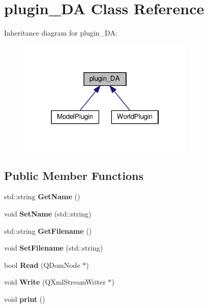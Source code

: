 \section{plugin\+\_\+\+DA Class Reference}
\label{classplugin___d_a}


Inheritance diagram for plugin\+\_\+\+DA\+:\nopagebreak
\begin{figure}[H]
\begin{center}
\leavevmode
\includegraphics[width=238pt]{classplugin___d_a__inherit__graph}
\end{center}
\end{figure}
\subsection*{Public Member Functions}
\begin{DoxyCompactItemize}
\item 
std\+::string {\bfseries Get\+Name} ()\label{classplugin___d_a_a1a3dfa9bbe0ad5acde3db7fcf5126581}

\item 
void {\bfseries Set\+Name} (std\+::string)\label{classplugin___d_a_ac25a25349a517ec702728a72941e7a6b}

\item 
std\+::string {\bfseries Get\+Filename} ()\label{classplugin___d_a_a83c8658a444d89c6359e47083a77e00c}

\item 
void {\bfseries Set\+Filename} (std\+::string)\label{classplugin___d_a_abdb5866ab1756ea2614d9af9744ef713}

\item 
bool {\bfseries Read} (Q\+Dom\+Node $\ast$)\label{classplugin___d_a_ab3a4c9cf8f84afad2de168514a398249}

\item 
void {\bfseries Write} (Q\+Xml\+Stream\+Writer $\ast$)\label{classplugin___d_a_a9449239cbdfcead545eed6812100cf60}

\item 
void {\bfseries print} ()\label{classplugin___d_a_a8b5eff54efe9b9b99e0d8b3e579f2596}

\end{DoxyCompactItemize}
